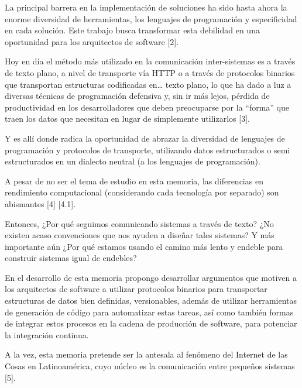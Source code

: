 La principal barrera en la implementación de soluciones ha sido hasta ahora la enorme diversidad de herramientas, los lenguajes de programación y especificidad en cada solución. Este trabajo busca transformar esta debilidad en una oportunidad para los arquitectos de software [2].

Hoy en día el método más utilizado en la comunicación inter-sistemas es a través de texto plano, a nivel de transporte vía HTTP o a través de protocolos binarios que transportan estructuras codificadas en… texto plano, lo que ha dado a luz a diversas técnicas de programación defensiva y, sin ir más lejos, pérdida de productividad en los desarrolladores que deben preocuparse por la “forma” que traen los datos que necesitan en lugar de simplemente utilizarlos [3].

Y es allí donde radica la oportunidad de abrazar la diversidad de lenguajes de programación y protocolos de transporte, utilizando datos estructurados o semi estructurados en un dialecto neutral (a los lenguajes de programación).

A pesar de no ser el tema de estudio en esta memoria, las diferencias en rendimiento computacional (considerando cada tecnología por separado) son abismantes [4] [4.1].

Entonces, ¿Por qué seguimos comunicando sistemas a través de texto? ¿No existen acaso convenciones que nos ayuden a diseñar tales sistemas? Y más importante aún ¿Por qué estamos usando el camino más lento y endeble para construir sistemas igual de endebles?

En el desarrollo de esta memoria propongo desarrollar argumentos que motiven a los arquitectos de software a utilizar protocolos binarios para transportar estructuras de datos bien definidas, versionables, además de utilizar herramientas de generación de código para automatizar estas tareas, así como también formas de integrar estos procesos en la cadena de producción de software, para potenciar la integración continua.

A la vez, esta memoria pretende ser la antesala al fenómeno del Internet de las Cosas en Latinoamérica, cuyo núcleo es la comunicación entre pequeños sistemas [5].
